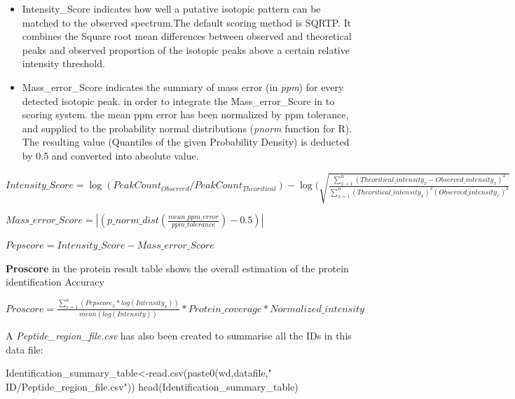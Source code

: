 \documentclass[
]{article}
\newenvironment{Shaded}{\begin{snugshade}}{\end{snugshade}}
\newcommand{\FunctionTok}[1]{\textcolor[rgb]{0.00,0.00,0.00}{#1}}
\newcommand{\NormalTok}[1]{#1}
\newcommand{\OtherTok}[1]{\textcolor[rgb]{0.56,0.35,0.01}{#1}}
\newcommand{\StringTok}[1]{\textcolor[rgb]{0.31,0.60,0.02}{#1}}
\begin{document}
\begin{itemize}
\item
  Intensity\_Score indicates how well a putative isotopic pattern can be
  matched to the observed spectrum.The default scoring method is SQRTP.
  It combines the Square root mean differences between observed and
  theoretical peaks and observed proportion of the isotopic peaks above
  a certain relative intensity threshold.
\item
  Mass\_error\_Score indicates the summary of mass error (in \emph{ppm})
  for every detected isotopic peak. in order to integrate the
  Mass\_error\_Score in to scoring system. the mean ppm error has been
  normalized by ppm tolerance, and supplied to the probability normal
  distributions (\emph{pnorm} function for R). The resulting value
  (Quantiles of the given Probability Density) is deducted by 0.5 and
  converted into absolute value.
\end{itemize}

\(Intensity\_Score=\log(PeakCount_{Observed}/PeakCount_{Theoritical})-\log(\sqrt{\frac{\sum_{x = 1}^{n} (Theoritical\_intensity_x-Observed\_intensity_x)^2}{\sum_{x = 1}^{n} (Theoritical\_intensity_x)^2(Observed\_intensity_x)^2}}\)

\(Mass\_error\_Score=|(p\_norm\_dist(\frac{mean\_ppm\_error}{ppm\_tolerance})-0.5)|\)

\(Pepscore=Intensity\_Score-Mass\_error\_Score\)

\textbf{Proscore} in the protein result table shows the overall
estimation of the protein identification Accuracy

\(Proscore=\frac{\sum_{x = 1}^{n}(Pepscore_x*log(Intensity_x))}{mean(log(Intensity))}*Protein\_coverage*Normalized\_intensity\)

A \emph{Peptide\_region\_file.csv} has also been created to summarise
all the IDs in this data file:

\begin{Shaded}
\begin{Highlighting}[]
\NormalTok{Identification\_summary\_table}\OtherTok{\textless{}{-}}\FunctionTok{read.csv}\NormalTok{(}\FunctionTok{paste0}\NormalTok{(wd,datafile,}\StringTok{" ID/Peptide\_region\_file.csv"}\NormalTok{))}
\FunctionTok{head}\NormalTok{(Identification\_summary\_table)}
\end{Highlighting}
\end{Shaded}
\end{document}
